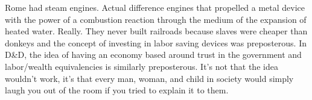 Rome had steam engines. Actual difference engines that propelled a metal device with the power of a combustion reaction through the medium of the expansion of heated water. Really. They never built railroads because slaves were cheaper than donkeys and the concept of investing in labor saving devices was preposterous. In D\&D, the idea of having an economy based around trust in the government and labor/wealth equivalencies is similarly preposterous. It's not that the idea wouldn't work, it's that every man, woman, and child in society would simply laugh you out of the room if you tried to explain it to them.
